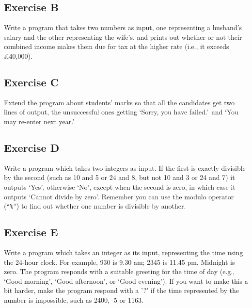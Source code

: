 \subsection*{Exercise B}

Write a program that takes two numbers as input, one representing a
husband's salary and the other representing the wife's, and prints out
whether or not their combined income makes them due for tax at the higher rate
(i.e., it exceeds \pounds 40,000).

\subsection*{Exercise C}

Extend the program about students' marks so that all the candidates
get two lines of output, the unsuccessful ones getting `Sorry, you
have failed.'\ and `You may re-enter next year.'

\subsection*{Exercise D}

Write a program which takes two integers as input.
If the first is exactly divisible
by the second (such as 10 and 5 or 24 and 8, but not 10 and 3 or 24 and 7)
it outputs `Yes', otherwise `No', except when the second
is zero, in which case it outputs `Cannot divide by zero'. Remember
you can use the modulo operator (``\texttt{\%}'') to find out whether one
number is divisible by another. 

\subsection*{Exercise E}

Write a program which takes an integer as its input, representing the time
using the 24-hour clock.  For example, 930 is 9.30 am; 2345 is 11.45 pm.  Midnight is
zero. The program responds with a suitable greeting for the time of day
(e.g., `Good morning', `Good afternoon', or `Good evening').
If you want to make this a bit harder, make the program respond with a '?'
if the time represented by the number is impossible, such as 2400, -5 or
1163.





